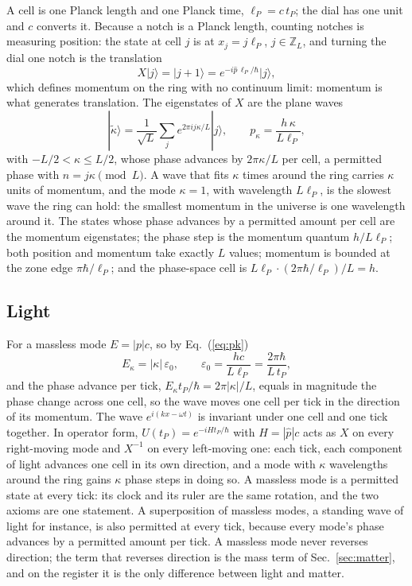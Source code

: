 \documentclass[aps,prd,twocolumn,superscriptaddress,nofootinbib]{revtex4-2}
\begin{document}
A cell is one Planck length and one Planck time, $\ell_P = c\,t_P$; the dial has one unit and $c$ converts it. Because a notch is a Planck length, counting notches is measuring position: the state at cell $j$ is at $x_j = j\ell_P$, $j\in\mathbb{Z}_L$, and turning the dial one notch is the translation
\begin{equation}
X|j\rangle = |j+1\rangle = e^{-i\hat p\,\ell_P/\hbar}|j\rangle ,
\label{eq:X}
\end{equation}
which defines momentum on the ring with no continuum limit: momentum is what generates translation. The eigenstates of $X$ are the plane waves
\begin{equation}
|\tilde\kappa\rangle = \frac{1}{\sqrt L}\sum_j e^{2\pi i j\kappa/L}|j\rangle, \qquad p_\kappa = \frac{h\,\kappa}{L\ell_P},
\label{eq:pk}
\end{equation}
with $-L/2 < \kappa \le L/2$, whose phase advances by $2\pi\kappa/L$ per cell, a permitted phase with $n = j\kappa \pmod L$. A wave that fits $\kappa$ times around the ring carries $\kappa$ units of momentum, and the mode $\kappa = 1$, with wavelength $L\ell_P$, is the slowest wave the ring can hold: the smallest momentum in the universe is one wavelength around it. The states whose phase advances by a permitted amount per cell are the momentum eigenstates; the phase step is the momentum quantum $h/L\ell_P$; both position and momentum take exactly $L$ values; momentum is bounded at the zone edge $\pi\hbar/\ell_P$; and the phase-space cell is $L\ell_P\cdot(2\pi\hbar/\ell_P)/L = h$.

\subsection{Light}
\label{sec:light}

For a massless mode $E = |p|c$, so by Eq.~(\ref{eq:pk})
\begin{equation}
E_\kappa = |\kappa|\,\varepsilon_0, \qquad \varepsilon_0 = \frac{hc}{L\ell_P} = \frac{2\pi\hbar}{L\,t_P},
\label{eq:eps0}
\end{equation}
and the phase advance per tick, $E_\kappa t_P/\hbar = 2\pi|\kappa|/L$, equals in magnitude the phase change across one cell, so the wave moves one cell per tick in the direction of its momentum. The wave $e^{i(kx-\omega t)}$ is invariant under one cell and one tick together. In operator form, $U(t_P) = e^{-iHt_P/\hbar}$ with $H = |\hat p|c$ acts as $X$ on every right-moving mode and $X^{-1}$ on every left-moving one: each tick, each component of light advances one cell in its own direction, and a mode with $\kappa$ wavelengths around the ring gains $\kappa$ phase steps in doing so. A massless mode is a permitted state at every tick: its clock and its ruler are the same rotation, and the two axioms are one statement. A superposition of massless modes, a standing wave of light for instance, is also permitted at every tick, because every mode's phase advances by a permitted amount per tick. A massless mode never reverses direction; the term that reverses direction is the mass term of Sec.~\ref{sec:matter}, and on the register it is the only difference between light and matter.
\end{document}
